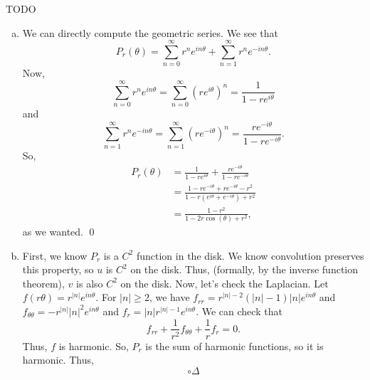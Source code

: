 \documentclass{article}
\begin{document}
\newpage
{} TODO
 \tri
\hop 
\solution
\begin{enumerate}[(a)]
    \item We can directly compute the geometric series. We see that 
    \[P_r(\theta) = \sum_{n=0}^\infty r^n e^{in\theta} + \sum_{n=1}^\infty r^n e^{-in\theta}.\]
    Now,
    \[\sum_{n=0}^\infty r^n e^{in\theta} = \sum_{n=0}^\infty (re^{i\theta})^n = \frac{1}{1-re^{i\theta}}\]
    and
    \[\sum_{n=1}^\infty r^n e^{-in\theta} = \sum_{n=1}^\infty (re^{-i\theta})^n = \frac{re^{-i\theta}}{1-re^{-i\theta}}.\]
    So,
    \begin{align*}
        P_r(\theta) &= \frac{1}{1-re^{i\theta}}+\frac{re^{-i\theta}}{1-re^{-i\theta}} \\
        &= \frac{1-re^{-i\theta}+re^{-i\theta} - r^2}{1-r(e^{i\theta} + e^{-i\theta}) + r^2} \\
        &= \frac{1-r^2}{1-2r\cos(\theta) + r^2},
    \end{align*}
    as we wanted. \qed
    \item First, we know $P_r$ is a $C^2$ function in the disk. We know convolution preserves this property, so $u$ is $C^2$ on the disk. Thus, (formally, by the inverse function theorem), $v$ is also $C^2$ on the disk. 
    \hop Now, let's check the Laplacian. Let $f(r \theta) = r^{|n|}e^{in\theta}$. For $|n| \ge 2$, we have $f_{rr} = r^{|n| - 2}(|n|-1)|n|e^{in\theta}$ and $f_{\theta\theta} = -r^{|n|}|n|^2e^{in\theta}$ and $f_r = |n|r^{|n|-1}e^{in\theta}$. We can check that 
    \[f_{rr}+\frac{1}{r^2}f_{\theta\theta} + \frac{1}{r}f_r = 0.\]
    Thus, $f$ is harmonic. So, $P_r$ is the sum of harmonic functions, so it is harmonic. Thus,
    \[\circ{\Delta}\]
\end{enumerate}
\end{document}
